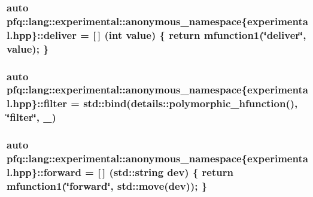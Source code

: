 \hypertarget{namespacepfq_1_1lang_1_1experimental_1_1anonymous__namespace_02experimental_8hpp_03_aabd600ebf1ee62184fa0765f49f9f990}{
\subsubsection[{deliver}]{\setlength{\rightskip}{0pt plus 5cm}auto pfq\+::lang\+::experimental\+::anonymous\+\_\+namespace\{experimental.\+hpp\}\+::deliver = \mbox{[}$\,$\mbox{]} (int value) \{ return {\bf mfunction1}(\char`\"{}deliver\char`\"{}, value); \}}}\label{namespacepfq_1_1lang_1_1experimental_1_1anonymous__namespace_02experimental_8hpp_03_aabd600ebf1ee62184fa0765f49f9f990}
\hypertarget{namespacepfq_1_1lang_1_1experimental_1_1anonymous__namespace_02experimental_8hpp_03_ae9cec76098e666e9b129804f44a93ae1}{
\subsubsection[{filter}]{\setlength{\rightskip}{0pt plus 5cm}auto pfq\+::lang\+::experimental\+::anonymous\+\_\+namespace\{experimental.\+hpp\}\+::filter = std\+::bind(details\+::polymorphic\+\_\+hfunction(), \char`\"{}filter\char`\"{}, \+\_)}}\label{namespacepfq_1_1lang_1_1experimental_1_1anonymous__namespace_02experimental_8hpp_03_ae9cec76098e666e9b129804f44a93ae1}
\hypertarget{namespacepfq_1_1lang_1_1experimental_1_1anonymous__namespace_02experimental_8hpp_03_a52cf166afea2ff74bffc6efbf839af0a}{
\subsubsection[{forward}]{\setlength{\rightskip}{0pt plus 5cm}auto pfq\+::lang\+::experimental\+::anonymous\+\_\+namespace\{experimental.\+hpp\}\+::forward = \mbox{[}$\,$\mbox{]} (std\+::string dev) \{ return {\bf mfunction1}(\char`\"{}forward\char`\"{}, std\+::move(dev)); \}}}\label{namespacepfq_1_1lang_1_1experimental_1_1anonymous__namespace_02experimental_8hpp_03_a52cf166afea2ff74bffc6efbf839af0a}
